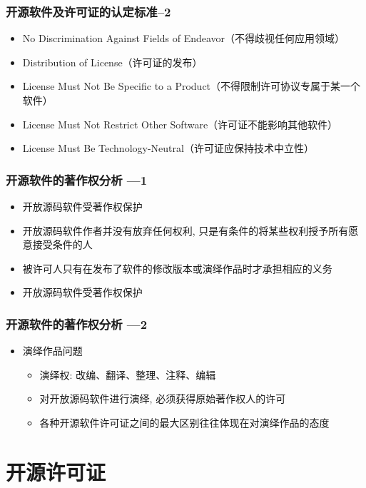 \documentclass[compress]{beamer}
\begin{document}
\begin{frame}
\frametitle{开源软件及许可证的认定标准--2}
\begin{itemize}
\item No Discrimination Against Fields of Endeavor（不得歧视任何应用领域）
\item Distribution of License（许可证的发布）
\item License Must Not Be Specific to a Product（不得限制许可协议专属于某一个软件）
\item License Must Not Restrict Other Software（许可证不能影响其他软件）
\item License Must Be Technology-Neutral（许可证应保持技术中立性）
\end{itemize}

\end{frame}


\begin{frame}
\frametitle{开源软件的著作权分析 ---1 }
\begin{itemize}
\item 开放源码软件受著作权保护
\item 开放源码软件作者并没有放弃任何权利, 只是有条件的将某些权利授予所有愿意接受条件的人
\item 被许可人只有在发布了软件的修改版本或演绎作品时才承担相应的义务
\item 开放源码软件受著作权保护
  \end{itemize}
  
\end{frame}

\begin{frame}
\frametitle{开源软件的著作权分析 ---2 }
\begin{itemize}
\item 演绎作品问题
    \begin{itemize}
      \item 演绎权: 改编、翻译、整理、注释、编辑
      \item 对开放源码软件进行演绎, 必须获得原始著作权人的许可
      \item 各种开源软件许可证之间的最大区别往往体现在对演绎作品的态度
    \end{itemize}
\end{itemize}

\end{frame}

\section{开源许可证}
\end{document}
